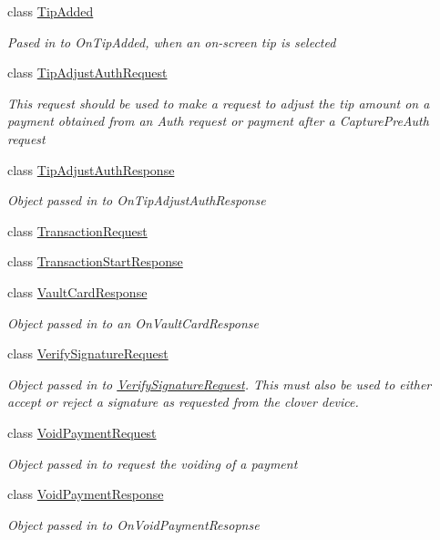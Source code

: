 \begin{DoxyCompactItemize}
class \hyperlink{classcom_1_1clover_1_1remotepay_1_1sdk_1_1_tip_added}{Tip\+Added}
\begin{DoxyCompactList}\small\item\em Pased in to On\+Tip\+Added, when an on-\/screen tip is selected \end{DoxyCompactList}\item 
class \hyperlink{classcom_1_1clover_1_1remotepay_1_1sdk_1_1_tip_adjust_auth_request}{Tip\+Adjust\+Auth\+Request}
\begin{DoxyCompactList}\small\item\em This request should be used to make a request to adjust the tip amount on a payment obtained from an Auth request or payment after a Capture\+Pre\+Auth request \end{DoxyCompactList}\item 
class \hyperlink{classcom_1_1clover_1_1remotepay_1_1sdk_1_1_tip_adjust_auth_response}{Tip\+Adjust\+Auth\+Response}
\begin{DoxyCompactList}\small\item\em Object passed in to On\+Tip\+Adjust\+Auth\+Response \end{DoxyCompactList}\item 
class \hyperlink{classcom_1_1clover_1_1remotepay_1_1sdk_1_1_transaction_request}{Transaction\+Request}
\item 
class \hyperlink{classcom_1_1clover_1_1remotepay_1_1sdk_1_1_transaction_start_response}{Transaction\+Start\+Response}
\item 
class \hyperlink{classcom_1_1clover_1_1remotepay_1_1sdk_1_1_vault_card_response}{Vault\+Card\+Response}
\begin{DoxyCompactList}\small\item\em Object passed in to an On\+Vault\+Card\+Response \end{DoxyCompactList}\item 
class \hyperlink{classcom_1_1clover_1_1remotepay_1_1sdk_1_1_verify_signature_request}{Verify\+Signature\+Request}
\begin{DoxyCompactList}\small\item\em Object passed in to \hyperlink{classcom_1_1clover_1_1remotepay_1_1sdk_1_1_verify_signature_request}{Verify\+Signature\+Request}. This must also be used to either accept or reject a signature as requested from the clover device. \end{DoxyCompactList}\item 
class \hyperlink{classcom_1_1clover_1_1remotepay_1_1sdk_1_1_void_payment_request}{Void\+Payment\+Request}
\begin{DoxyCompactList}\small\item\em Object passed in to request the voiding of a payment \end{DoxyCompactList}\item 
class \hyperlink{classcom_1_1clover_1_1remotepay_1_1sdk_1_1_void_payment_response}{Void\+Payment\+Response}
\begin{DoxyCompactList}\small\item\em Object passed in to On\+Void\+Payment\+Resopnse \end{DoxyCompactList}\end{DoxyCompactItemize}
